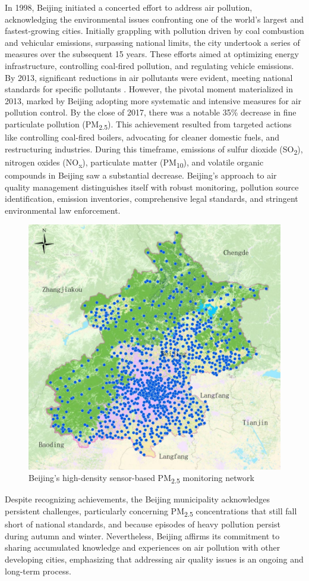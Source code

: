 In 1998, Beijing initiated a concerted effort to address air pollution, acknowledging the environmental issues confronting one of the world's largest and fastest-growing cities. Initially grappling with pollution driven by coal combustion and vehicular emissions, surpassing national limits, the city undertook a series of measures over the subsequent 15 years. These efforts aimed at optimizing energy infrastructure, controlling coal-fired pollution, and regulating vehicle emissions. By 2013, significant reductions in air pollutants were evident, meeting national standards for specific pollutants \cite{CCAC2019}.
However, the pivotal moment materialized in 2013, marked by Beijing adopting more systematic and intensive measures for air pollution control. By the close of 2017, there was a notable 35\% decrease in fine particulate pollution (PM\textsubscript{2.5}). This achievement resulted from targeted actions like controlling coal-fired boilers, advocating for cleaner domestic fuels, and restructuring industries. During this timeframe, emissions of sulfur dioxide (SO\textsubscript{2}), nitrogen oxides (NO\textsubscript{x}), particulate matter (PM\textsubscript{10}), and volatile organic compounds in Beijing saw a substantial decrease. Beijing's approach to air quality management distinguishes itself with robust monitoring, pollution source identification, emission inventories, comprehensive legal standards, and stringent environmental law enforcement. 

\begin{figure}
    \centering
    \includegraphics[width=0.5\linewidth]{images/beijingsensors.png}
    \caption{Beijing's high-density sensor-based PM\textsubscript{2.5} monitoring network \cite{UNEnvironment2019}}
    \label{fig:beijingsensors}
\end{figure}

Despite recognizing achievements, the Beijing municipality acknowledges persistent challenges, particularly concerning PM\textsubscript{2.5} concentrations that still fall short of national standards, and because episodes of heavy pollution persist during autumn and winter. Nevertheless, Beijing affirms its commitment to sharing accumulated knowledge and experiences on air pollution with other developing cities, emphasizing that addressing air quality issues is an ongoing and long-term process.

